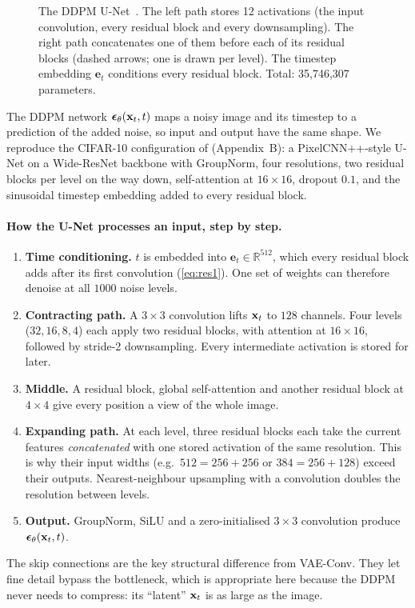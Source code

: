 \begin{figure}[H]
\begin{tikzpicture}
\end{tikzpicture}
\caption{The DDPM U-Net~\citep{ronneberger2015unet,salimans2017pixelcnnpp}. The left path stores 12 activations
(the input convolution, every residual block and every downsampling). The right path concatenates one of them
before each of its residual blocks (dashed arrows; one is drawn per level). The timestep embedding
$\mathbf{e}_t$ conditions every residual block. Total: 35,746,307 parameters.}
\label{fig:arch-unet}
\end{figure}

The DDPM network $\bm{\epsilon}_\theta(\mathbf{x}_t,t)$ maps a noisy image and its timestep to a prediction of the added noise, so
input and output have the same shape. We reproduce the CIFAR-10 configuration of \citet{ho2020ddpm}
(Appendix~B): a PixelCNN++-style U-Net on a Wide-ResNet backbone with GroupNorm, four resolutions, two residual
blocks per level on the way down, self-attention at $16\times16$, dropout $0.1$, and the sinusoidal timestep
embedding added to every residual block.

\paragraph{How the U-Net processes an input, step by step.}
\begin{enumerate}
  \item \textbf{Time conditioning.} $t$ is embedded into $\mathbf{e}_t\in\mathbb{R}^{512}$, which every residual
        block adds after its first convolution (\cref{eq:res1}). One set of weights can therefore denoise at all
        $1000$ noise levels.
  \item \textbf{Contracting path.} A $3\times3$ convolution lifts $\mathbf{x}_t$ to $128$ channels. Four levels
        ($32,16,8,4$) each apply two residual blocks, with attention at $16\times16$, followed by stride-2
        downsampling. Every intermediate activation is stored for later.
  \item \textbf{Middle.} A residual block, global self-attention and another residual block at $4\times4$ give
        every position a view of the whole image.
  \item \textbf{Expanding path.} At each level, three residual blocks each take the current features
        \emph{concatenated} with one stored activation of the same resolution. This is why their input widths
        (e.g.\ $512=256+256$ or $384=256+128$) exceed their outputs. Nearest-neighbour upsampling with a
        convolution doubles the resolution between levels.
  \item \textbf{Output.} GroupNorm, SiLU and a zero-initialised $3\times3$ convolution produce
        $\bm{\epsilon}_\theta(\mathbf{x}_t,t)$.
\end{enumerate}
The skip connections are the key structural difference from VAE-Conv. They let fine detail bypass the bottleneck,
which is appropriate here because the DDPM never needs to compress: its ``latent'' $\mathbf{x}_t$ is as large as the image.

